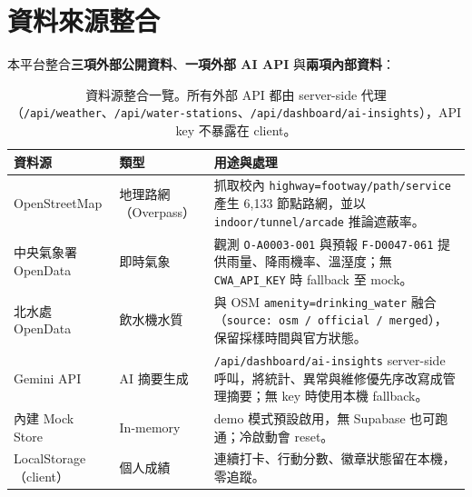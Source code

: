\documentclass[11pt,a4paper]{article}
\begin{document}

\section{資料來源整合}

本平台整合\textbf{三項外部公開資料}、\textbf{一項外部 AI API} 與\textbf{兩項內部資料}：

\begin{table}[H]
\centering
\footnotesize
\renewcommand{\arraystretch}{1.16}
\begin{tabularx}{\linewidth}{@{}p{2.75cm}p{2.65cm}X@{}}
\toprule
\textbf{資料源} & \textbf{類型} & \textbf{用途與處理}\\
\midrule
OpenStreetMap & 地理路網（Overpass） & 抓取校內 \texttt{highway=footway/path/service} 產生 6{,}133 節點路網，並以 \texttt{indoor/tunnel/arcade} 推論遮蔽率。\\
中央氣象署 OpenData & 即時氣象 & 觀測 \texttt{O-A0003-001} 與預報 \texttt{F-D0047-061} 提供雨量、降雨機率、溫溼度；無 \texttt{CWA\_API\_KEY} 時 fallback 至 mock。\\
北水處 OpenData & 飲水機水質 & 與 OSM \texttt{amenity=drinking\_water} 融合（\texttt{source: osm / official / merged}），保留採樣時間與官方狀態。\\
Gemini API & AI 摘要生成 & \texttt{/api/dashboard/ai-insights} server-side 呼叫，將統計、異常與維修優先序改寫成管理摘要；無 key 時使用本機 fallback。\\
\midrule
內建 Mock Store & In-memory & demo 模式預設啟用，無 Supabase 也可跑通；冷啟動會 reset。\\
LocalStorage（client） & 個人成績 & 連續打卡、行動分數、徽章狀態留在本機，零追蹤。\\
\bottomrule
\end{tabularx}
\caption{資料源整合一覽。所有外部 API 都由 server-side 代理（\texttt{/api/weather}、\texttt{/api/water-stations}、\texttt{/api/dashboard/ai-insights}），API key 不暴露在 client。}
\end{table}

\end{document}
